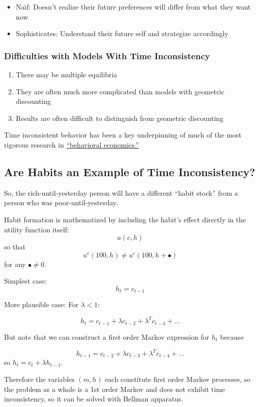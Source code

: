 \documentclass{scrartcl}
\begin{document}
\begin{itemize}
\item Na\"{\i}f: Doesn't realize their future preferences will differ from what they want now
\item Sophisticates: Understand their future self and strategize accordingly
\end{itemize}

\subsubsection*{Difficulties with Models With Time Inconsistency}
\begin{enumerate}
\item There may be multiple equilibria
\item They are often much more complicated than models with geometric discounting
  \item Results are often difficult to distinguish from geometric discounting
\end{enumerate}

Time inconsistent behavior has been a key underpinning of much of the most rigorous research in \href{https://en.wikipedia.org/wiki/Dynamic_inconsistency#In_behavioral_economics}{``behavioral economics.''}

\label{habits}
\subsection*{Are Habits an Example of Time Inconsistency?}

So, the rich-until-yesterday person will have a different ``habit stock'' from a person who was poor-until-yesterday.

Habit formation is mathematized by including the habit's effect directly in the utility function itself:
\[ u(c,h)
\]
so that 
\[ u^{c}(100,h) \neq u^{c}(100,h+\bullet)
\]
for any $\bullet \neq 0$.

Simplest case:
\[ h_{t} = c_{t-1}
\]

More plausible case: For $\lambda < 1$:

\[ h_{t} = c_{t-1} + \lambda c_{t-2} + \lambda^{T} c_{t-3} + ...
\]

But note that we can construct a first order Markov expression for $h_{t}$ because

\[ h_{t-1} = c_{t-2} + \lambda c_{t-3} + \lambda^{T} c_{t-4} + ...
\]
so $h_{t}=c_{t}+\lambda h_{t-1}$.

Therefore the variables $(m,h)$ each constitute first order Markov processes, so the problem as a whole is a 1st order Markov and does not exhibit time inconsistency, so it can be solved with Bellman apparatus.
\end{document}
